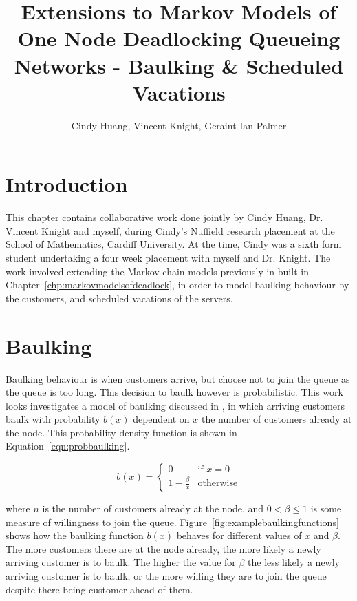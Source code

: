\documentclass{article}
\title{Extensions to Markov Models of One Node Deadlocking Queueing Networks - Baulking \& Scheduled Vacations}
\author{Cindy Huang, Vincent Knight, Geraint Ian Palmer}
\date{}
\begin{document}
\onehalfspacing

\maketitle

\section{Introduction}

This chapter contains collaborative work done jointly by Cindy Huang, Dr. Vincent Knight and myself, during Cindy's Nuffield research placement \cite{nuffieldresearchplacements} at the School of Mathematics, Cardiff University. At the time, Cindy was a sixth form student undertaking a four week placement with myself and Dr. Knight. The work involved extending the Markov chain models previously in built in Chapter~\ref{chp:markovmodelsofdeadlock}, in order to model baulking behaviour by the customers, and scheduled vacations of the servers.


\section{Baulking}

Baulking behaviour is when customers arrive, but choose not to join the queue as
the queue is too long. This decision to baulk however is probabilistic. This
work looks investigates a model of baulking discussed in
\cite{anckergafarian63}, in which arriving customers baulk with probability
$b(x)$ dependent on $x$ the number of customers already at the node. This
probability density function is shown in Equation~\ref{eqn:probbaulking}.

\begin{equation}\label{eqn:probbaulking}
    b(x) = \left\{ \begin{array}{rr}
    0 & \text{if } x = 0\\
    1 - \frac{\beta}{x} & \text{otherwise}
    \end{array} \right.
\end{equation}

where $n$ is the number of customers already at the node, and $0 < \beta \leq 1$ is some measure of willingness to join the queue. Figure~\ref{fig:examplebaulkingfunctions} shows how the baulking function $b(x)$ behaves for different values of $x$ and $\beta$.
The more customers there are at the node already, the more likely a newly arriving customer is to baulk. The higher the value for $\beta$ the less likely a newly arriving customer is to baulk, or the more willing they are to join the queue despite there being customer ahead of them.
\end{document}
